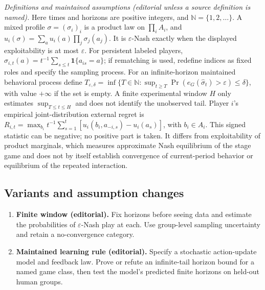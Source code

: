 \documentclass[11pt,a4paper]{article}
\begin{document}
\emph{Definitions and maintained assumptions (editorial unless a source definition is named).} Here times and horizons are positive integers, and \(\mathbb N=\{1,2,\ldots\}\). A mixed profile \(\sigma=(\sigma_i)_i\) is a product law on \(\prod_i A_i\), and \(u_i(\sigma)=\sum_a u_i(a)\prod_j\sigma_j(a_j)\). It is \(\varepsilon\)-Nash exactly when the displayed exploitability is at most \(\varepsilon\). For persistent labeled players, \(\widehat\sigma_{i,t}(a)=t^{-1}\sum_{s\le t}\mathbf1\{a_{is}=a\}\); if rematching is used, redefine indices as fixed roles and specify the sampling process. For an infinite-horizon maintained behavioral process define \(T_{\varepsilon,\delta}=\inf\{T\in\mathbb N:\sup_{t\ge T}\Pr(e_G(\widehat\sigma_t)>\varepsilon)\le\delta\}\), with value \(+\infty\) if the set is empty. A finite experimental window \(H\) only estimates \(\sup_{T\le t\le H}\) and does not identify the unobserved tail. Player \(i\)'s empirical joint-distribution external regret is \(R_{i,t}=\max_{b_i}t^{-1}\sum_{s=1}^t[u_i(b_i,a_{-i,s})-u_i(a_s)]\), with \(b_i\in A_i\). This signed statistic can be negative; no positive part is taken. It differs from exploitability of product marginals, which measures approximate Nash equilibrium of the stage game and does not by itself establish convergence of current-period behavior or equilibrium of the repeated interaction.
\subsection*{Variants and assumption changes}
\begin{enumerate}
\item \textbf{Finite window (editorial).} Fix horizons before seeing data and estimate the probabilities of \(\varepsilon\)-Nash play at each. Use group-level sampling uncertainty and retain a no-convergence category.
\item \textbf{Maintained learning rule (editorial).} Specify a stochastic action-update model and feedback law. Prove or refute an infinite-tail horizon bound for a named game class, then test the model’s predicted finite horizons on held-out human groups.
\end{enumerate}
\end{document}

